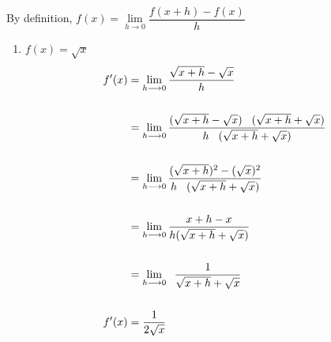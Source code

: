 \documentclass[11pt,a4paper]{article}
\begin{document}
By definition, $f(x)=\lim \limits_{h \longrightarrow 0} \dfrac{f(x+h)-f(x)}{h}$\\
\begin{enumerate}
\item[(i).] $f(x)=\sqrt{x}$
\begin{align*}
f'(x) & = \lim_{h \longrightarrow 0} \frac{\sqrt{x+h}-\sqrt{x}}{h}\\\\
 & = \lim_{h \longrightarrow 0} \frac{(\sqrt{x+h}-\sqrt{x})\hspace{0.3cm}(\sqrt{x+h}+\sqrt{x})}{h \hspace{0.3cm}(\sqrt{x+h}+\sqrt{x})}\\\\
 & = \lim_{h \longrightarrow 0 } \frac{(\sqrt{x+h})^2-(\sqrt{x})^2}{h\hspace{0.3cm}(\sqrt{x+h}+\sqrt{x})}\\\\
 & = \lim _{h \longrightarrow 0} \frac{x+h-x}{h(\sqrt{x+h}+\sqrt{x})}\\\\
 & = \lim_{h \longrightarrow 0}\hspace{0.2cm} \frac{1}{\sqrt{x+h}+\sqrt{x}}\\\\
f'(x) & = \frac{1}{2\sqrt{x}}\\\\
\end{align*}



\end{enumerate}
\end{document}
